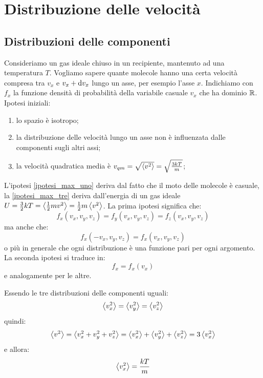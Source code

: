 \section{Distribuzione delle velocità}
\subsection{Distribuzioni delle componenti}
Consideriamo un gas ideale chiuso in un recipiente, mantenuto ad una temperatura $T$.
Vogliamo sapere quante molecole hanno una certa velocità compresa tra $v_x$ e $v_x+\mathrm{d} v_x$ lungo un asse, per esempio l'asse $x$. Indichiamo con $f_x$ la funzione densità di probabilità della variabile casuale $v_x$ che ha dominio $\mathbb{R}$. Ipotesi iniziali:
\begin{enumerate}
	\item lo spazio è isotropo;\label{ipotesi_max_uno}
	\item la distribuzione delle velocità lungo un asse non è influenzata dalle componenti sugli altri assi;\label{ipotesi_max_due}
	\item la velocità quadratica media è $v_{qm}=\sqrt{\left<v^2\right>}=\sqrt{\frac{3kT}{m}}$;\label{ipotesi_max_tre}
\end{enumerate}
L'ipotesi \ref{ipotesi_max_uno} deriva dal fatto che il moto delle molecole è casuale, la \ref{ipotesi_max_tre} deriva dall'energia di un gas ideale $U=\frac{3}{2}kT=\left<\frac{1}{2}mv^2\right>=\frac{1}{2}m\left<v^2\right>$. La prima ipotesi significa che:
\begin{equation}
	f_x(v_x,v_y,v_z)=f_y(v_x,v_y,v_z)=f_z(v_x,v_y,v_z)
\end{equation}
ma anche che:
\begin{equation}
	f_x(-v_x,v_y,v_z)=f_x(v_x,v_y,v_z)
\end{equation}
o più in generale che ogni distribuzione è una funzione pari per ogni argomento.
La seconda ipotesi si traduce in:
\begin{equation}
	f_x=f_x(v_x)
\end{equation}
e analogamente per le altre.

Essendo le tre distribuzioni delle componenti uguali:
\begin{equation}
	\left<v_x^2\right>=\left<v_y^2\right>=\left<v_z^2\right>
\end{equation}
quindi:
\begin{equation}
	\left<v^2\right>=\left<v_x^2+v_y^2+v_z^2\right>=\left<v_x^2\right>+\left<v_y^2\right>+\left<v_z^2\right>=3\left<v_x^2\right>
\end{equation}
e allora:
\begin{equation}
	\left<v_x^2\right>=\frac{kT}{m}
\end{equation}


